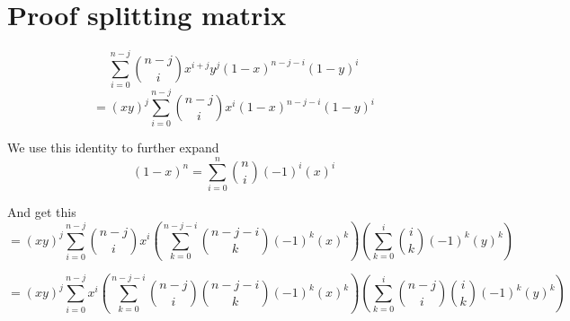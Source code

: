 \section{Proof splitting matrix}
\label{sec:proofsplittingmatrix}

\begin{equation*}
    \sum _{i=0}^{n-j} \binom{n-j}{i}x^{i+j}y^j(1-x)^{n-j-i}(1-y)^i 
\end{equation*}
\begin{equation*}
    =(xy)^j\sum _{i=0}^{n-j} \binom{n-j}{i}x^i(1-x)^{n-j-i}(1-y)^i 
\end{equation*}

We use this identity to further expand
\begin{equation*}
    (1-x)^n =
    \sum_{i = 0}^{n} {n \choose i} (-1)^{i}(x)^{i}
\end{equation*}

And get this
\begin{equation*}
    =(xy)^j\sum _{i=0}^{n-j} \binom{n-j}{i}x^i
    (\sum_{k = 0}^{n-j-i} {n-j-i \choose k} (-1)^{k}(x)^{k})
    (\sum_{k = 0}^{i} {i \choose k} (-1)^{k}(y)^{k})
\end{equation*}

\begin{equation*}
    =(xy)^j\sum _{i=0}^{n-j}x^i
    (\sum_{k = 0}^{n-j-i} \binom{n-j}{i}{n-j-i \choose k} (-1)^{k}(x)^{k})
    (\sum_{k = 0}^{i} \binom{n-j}{i}{i \choose k} (-1)^{k}(y)^{k})
\end{equation*}